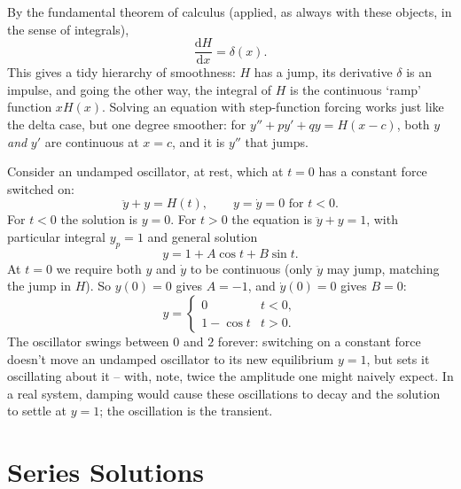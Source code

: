 \begin{center}
\end{center}

By the fundamental theorem of calculus (applied, as always with these objects, in the sense of integrals),
$$
\frac{\mathrm{d}H}{\mathrm{d}x} = \delta(x).
$$
This gives a tidy hierarchy of smoothness: $H$ has a jump, its derivative $\delta$ is an impulse, and going the other way, the integral of $H$ is the continuous `ramp' function $x H(x)$. Solving an equation with step-function forcing works just like the delta case, but one degree smoother: for $y'' + py' + qy = H(x - c)$, both $y$ \emph{and} $y'$ are continuous at $x = c$, and it is $y''$ that jumps.

\begin{example}
	Consider an undamped oscillator, at rest, which at $t = 0$ has a constant force switched on:
	$$
	\ddot y + y = H(t), \qquad y = \dot y = 0 \text{ for } t < 0.
	$$
	For $t < 0$ the solution is $y = 0$. For $t > 0$ the equation is $\ddot y + y = 1$, with particular integral $y_p = 1$ and general solution
	$$
	y = 1 + A \cos t + B \sin t.
	$$
	At $t = 0$ we require both $y$ and $\dot y$ to be continuous (only $\ddot y$ may jump, matching the jump in $H$). So $y(0) = 0$ gives $A = -1$, and $\dot y(0) = 0$ gives $B = 0$:
	$$
	y = \begin{cases} 0 & t < 0, \\ 1 - \cos t & t > 0. \end{cases}
	$$
	The oscillator swings between $0$ and $2$ forever: switching on a constant force doesn't move an undamped oscillator to its new equilibrium $y = 1$, but sets it oscillating about it -- with, note, twice the amplitude one might naively expect. In a real system, damping would cause these oscillations to decay and the solution to settle at $y = 1$; the oscillation is the transient.
\end{example}

\section{Series Solutions}

